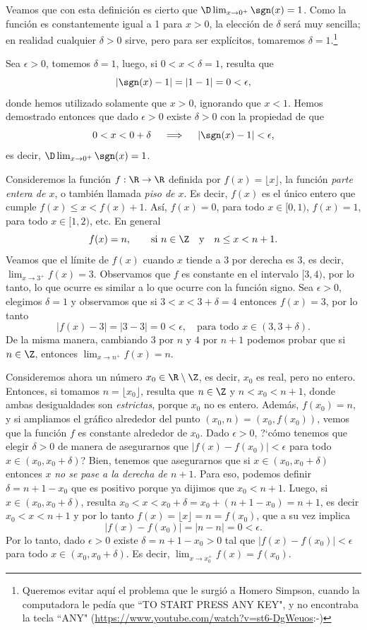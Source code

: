 \begin{example}
Veamos que con esta definición es cierto que $\D\lim_{x\to0^+} \sgn(x)=1$.
Como la función es constantemente igual a 1 para $x>0$, la elección de $\delta$ será muy sencilla; en realidad cualquier $\delta>0$ sirve, pero para ser explícitos, tomaremos $\delta=1$.\footnote{Queremos evitar aquí el problema que le surgió a Homero Simpson, cuando la computadora le pedía que ``TO START PRESS ANY KEY", y no encontraba la tecla ``ANY"  (\url{https://www.youtube.com/watch?v=st6-DgWeuos}\quad:-)}

Sea $\epsilon > 0$, tomemos $\delta=1$, luego, si $0<x<\delta=1$, resulta que
\[
|\sgn(x)-1| = |1-1|=0<\epsilon,
\]
donde hemos utilizado solamente que $x>0$, ignorando que $x<1$.
Hemos demostrado entonces que dado $\epsilon>0$ existe $\delta>0$ con la propiedad de que
\[
0<x<0+\delta \quad\implies\quad |\sgn(x)-1|<\epsilon,
\]
es decir, $\D\lim_{x\to0^+} \sgn(x)=1$.
\end{example}

\begin{example}
Consideremos la función $f:\R\to\R$ definida por $f(x)=\lfloor x\rfloor$, la función \emph{parte entera de $x$}, o también llamada \emph{piso de $x$}.
Es decir, $f(x)$ es el único entero que cumple $f(x)\le x< f(x)+1$. Así, $f(x)=0$, para todo $x\in[0,1)$, $f(x)=1$, para todo $x\in[1,2)$, etc. En general
\[
f(x)=n, \qquad \text{si }n\in\Z \quad\text{y}\quad n\le x < n+1.
\]
Veamos que el límite de $f(x)$ cuando $x$ tiende a $3$ por derecha es $3$, es decir, $\lim_{x\to 3^+}f(x)=3$.
Observamos que $f$ es constante en el intervalo $[3,4)$, por lo tanto, lo que ocurre es similar a lo que ocurre con la función signo.
Sea $\epsilon>0$, elegimos $\delta=1$ y observamos que si $3<x<3+\delta=4$ entonces $f(x)=3$,
por lo tanto
\[
|f(x)-3| = |3-3|=0<\epsilon,\quad\text{para todo $x\in (3,3+\delta)$}.
\]
De la misma manera, cambiando $3$ por $n$ y $4$ por $n+1$ podemos probar que si $n\in\Z$, entonces $\lim_{x\to n^+}f(x)=n$.

Consideremos ahora un número $x_0\in \R\setminus\Z$, es decir, $x_0$ es real, pero no entero. Entonces, si tomamos $n=\lfloor x_0 \rfloor$, resulta que
$n\in\Z$ y $n<x_0<n+1$, donde ambas desigualdades son \emph{estrictas}, porque $x_0$ no es entero.
Además, $f(x_0)=n$, y si ampliamos el gráfico alrededor del punto $(x_0,n)=(x_0,f(x_0))$, vemos que la función $f$ es constante alrededor de $x_0$.
Dado $\epsilon>0$, ?`cómo tenemos que elegir $\delta>0$ de manera de asegurarnos que $|f(x)-f(x_0)|<\epsilon$ para todo $x\in(x_0,x_0+\delta)$?
Bien, tenemos que asegurarnos que si $x\in(x_0,x_0+\delta)$ entonces $x$ \emph{no se pase a la derecha de $n+1$}.
Para eso, podemos definir $\delta=n+1-x_0$ que es positivo porque ya dijimos que $x_0<n+1$. Luego, si
$x\in(x_0,x_0+\delta)$, resulta $x_0<x<x_0+\delta = x_0+(n+1-x_0)=n+1$, es decir $x_0<x<n+1$ y por lo tanto $f(x)=\lfloor x \rfloor = n = f(x_0)$, que a su vez implica
\[
|f(x)-f(x_0)|=|n-n|=0<\epsilon.
\]
Por lo tanto, dado $\epsilon>0$ existe $\delta=n+1-x_0>0$ tal que $|f(x)-f(x_0)|<\epsilon$ para todo $x\in(x_0,x_0+\delta)$. Es decir, $\lim_{x\to x_0^+}f(x)=f(x_0)$.
\end{example}

